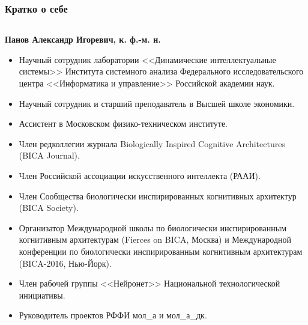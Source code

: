 \documentclass[default]{beamer}
\begin{document}
	\begin{frame}
		\frametitle{Кратко о себе}
		\scriptsize
		\begin{columns}
			\begin{column}{0.85\textwidth}
				\textbf{Панов Александр Игоревич, к. ф.-м. н.}
				\begin{itemize}
					\item Научный сотрудник лаборатории <<Динамические интеллектуальные системы>> Института системного анализа Федерального исследовательского центра <<Информатика и управление>> Российской академии наук.
					\item Научный сотрудник и старший преподаватель в Высшей школе экономики.
					\item Ассистент в Московском физико-техническом институте.
					\item Член редколлегии журнала Biologically Inspired Cognitive Architectures (BICA Journal).
					\item Член Российской ассоциации искусственного интеллекта (РААИ).
					\item Член Сообщества биологически инспирированных когнитивных архитектур (BICA Society).
					\item Организатор Международной	школы по биологически инспирированным когнитивным архитектурам (Fierces on BICA, Москва) и Международной конференции по биологически инспирированным когнитивным архитектурам (BICA-2016, Нью-Йорк).
					\item Член рабочей группы <<Нейронет>> Национальной технологической инициативы.
					\item Руководитель проектов РФФИ мол\_а и мол\_а\_дк.
				\end{itemize}
			\end{column}
			

\end{columns}
\end{frame}
\end{document}
